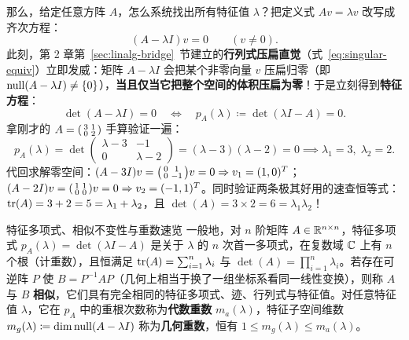 那么，给定任意方阵 $A$，怎么系统找出所有特征值 $\lambda$？把定义式 $Av = \lambda v$ 改写成齐次方程：
\[
  (A - \lambda I) v = 0 \qquad (v \neq 0).
\]
此刻，第 2 章第~\ref{sec:linalg-bridge}~节建立的\textbf{行列式压扁直觉}（式~\eqref{eq:singular-equiv}）立即发威：矩阵 $A - \lambda I$ 会把某个非零向量 $v$ 压扁归零（即 $\operatorname{null}(A - \lambda I) \neq \{0\}$），\textbf{当且仅当它把整个空间的体积压扁为零}！于是立刻得到\textbf{特征方程}：
\begin{equation}\label{eq:ch3-charpoly}
  \det(A - \lambda I) = 0 \quad \Longleftrightarrow \quad p_A(\lambda) \coloneqq \det(\lambda I - A) = 0.
\end{equation}
拿刚才的 $A = \begin{psmallmatrix}3 & 1 \\ 0 & 2\end{psmallmatrix}$ 手算验证一遍：
\[
  p_A(\lambda) = \det\begin{pmatrix} \lambda - 3 & -1 \\ 0 & \lambda - 2 \end{pmatrix} = (\lambda - 3)(\lambda - 2) = 0 \implies \lambda_1 = 3,\; \lambda_2 = 2.
\]
代回求解零空间：$(A - 3I)v = \begin{psmallmatrix}0 & 1 \\ 0 & -1\end{psmallmatrix}v = 0 \Rightarrow v_1 = (1, 0)^T$；$(A - 2I)v = \begin{psmallmatrix}1 & 1 \\ 0 & 0\end{psmallmatrix}v = 0 \Rightarrow v_2 = (-1, 1)^T$。同时验证两条极其好用的速查恒等式：$\operatorname{tr}(A) = 3 + 2 = 5 = \lambda_1 + \lambda_2$，且 $\det(A) = 3 \times 2 = 6 = \lambda_1 \lambda_2$！

\begin{recallBox}{特征多项式、相似不变性与重数速览}
一般地，对 $n$ 阶矩阵 $A \in \mathbb{R}^{n\times n}$，特征多项式 $p_A(\lambda) = \det(\lambda I - A)$ 是关于 $\lambda$ 的 $n$ 次首一多项式，在复数域 $\mathbb{C}$ 上有 $n$ 个根（计重数），且恒满足 $\operatorname{tr}(A) = \sum_{i=1}^n \lambda_i$ 与 $\det(A) = \prod_{i=1}^n \lambda_i$。若存在可逆阵 $P$ 使 $B = P^{-1}AP$（几何上相当于换了一组坐标系看同一线性变换），则称 $A$ 与 $B$ \textbf{相似}，它们具有完全相同的特征多项式、迹、行列式与特征值。对任意特征值 $\lambda$，它在 $p_A$ 中的重根次数称为\textbf{代数重数} $m_a(\lambda)$，特征子空间维数 $m_g(\lambda) \coloneqq \dim\operatorname{null}(A - \lambda I)$ 称为\textbf{几何重数}，恒有 $1 \le m_g(\lambda) \le m_a(\lambda)$。
\end{recallBox}

